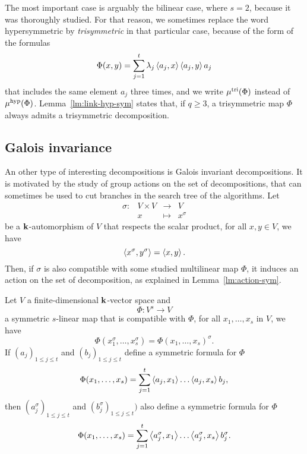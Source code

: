 The most important case is arguably the bilinear case, where $s=2$, because it
was thoroughly studied. For that reason, we sometimes replace the word
hypersymmetric by \emph{trisymmetric} in that particular case, because of the
form of the formulas
\[
  \Phi(x, y) = \sum_{j=1}^t\lambda_j\left\langle a_j,x\right\rangle\left\langle a_j,y\right\rangle a_j
\]
that includes the same element $a_j$ three times, and we write $\mu^{\textrm{tri}}(\Phi)$
instead of $\mu^{\textrm{hyp}}(\Phi)$. Lemma~\ref{lm:link-hyp-sym} states that, if $q\geq3$, a
trisymmetric map $\Phi$ always admits a trisymmetric decomposition.

\subsection{Galois invariance}

An other type of interesting decompositions is Galois invariant decompositions.
It is motivated by the study of group actions on the set of decompositions, that
can sometimes be used to cut branches in the search tree of the algorithms.
%
Let 
\[
 \begin{array}{cccc}
   \sigma: & V\times V &\to&V\\
 &x&\mapsto&x^\sigma
 \end{array}
\]
be a $\mathbf{k}$-automorphism of $V$ that respects the scalar product, \ie for all $x,
y\in V$, we have
\[
  \left\langle x^\sigma,y^\sigma\right\rangle = \left\langle x,y\right\rangle.
\]
Then, if $\sigma$ is also compatible with some studied multilinear map $\Phi$, it induces
an action on the set of decomposition, as explained in
Lemma~\ref{lm:action-sym}.
\begin{lm}
  \label{lm:action-sym}
  Let $V$ a finite-dimensional $\mathbf{k}$-vector space and
  \[
    \Phi:V^s\to V
  \]
  a symmetric $s$-linear map that is compatible with $\Phi$, \ie for all $x_1,
  \dots, x_s$ in $V$, we have
  \[
    \Phi(x_1^\sigma, \dots, x_s^\sigma) = \Phi(x_1, \dots, x_s)^\sigma.
  \]
  If $(a_j)_{1\leq j \leq t}$ and $(b_j)_{1\leq j \leq t}$ define a symmetric
  formula for $\Phi$
  \[
    \Phi(x_1, \dots, x_s) = \sum_{j=1}^t\left\langle a_j,x_1\right\rangle\dots\left\langle a_j,x_s\right\rangle b_j,
  \]
  then $(a_j^\sigma)_{1\leq j\leq t}$ and $(b_{j}^\sigma)_{1\leq j\leq t})$ also
  define a symmetric formula for $\Phi$
  \[
    \Phi(x_1, \dots, x_s) =
    \sum_{j=1}^t\left\langle a_j^\sigma,x_1\right\rangle\dots\left\langle a_j^\sigma,x_s\right\rangle b_j^\sigma.
  \]
\end{lm}

